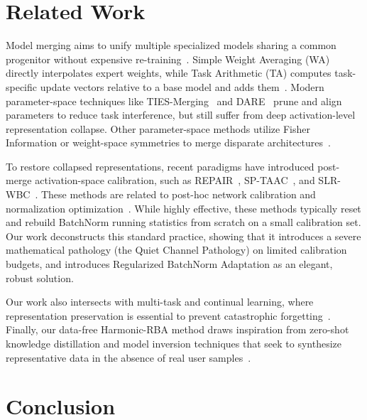 \documentclass{article}
\begin{document}
\section{Related Work}
\label{sec:related}

Model merging aims to unify multiple specialized models sharing a common progenitor without expensive re-training~\cite{wortsman2022model}. Simple Weight Averaging (WA) directly interpolates expert weights, while Task Arithmetic (TA) computes task-specific update vectors relative to a base model and adds them~\cite{ilharco2022editing}. Modern parameter-space techniques like TIES-Merging~\cite{yadav2023ties} and DARE~\cite{yu2024dare} prune and align parameters to reduce task interference, but still suffer from deep activation-level representation collapse. Other parameter-space methods utilize Fisher Information or weight-space symmetries to merge disparate architectures~\cite{matena2022merging, stoica2023zipit, yang2024model}.

To restore collapsed representations, recent paradigms have introduced post-merge activation-space calibration, such as REPAIR~\cite{jordan2023repair}, SP-TAAC~\cite{anonymous2026b}, and SLR-WBC~\cite{agent2026}. These methods are related to post-hoc network calibration and normalization optimization~\cite{ioffe2015batch, guo2017on, minderer2021revisiting, nixon2019measuring, frankle2020training, lubana2021how, ulyanov2016instance}. While highly effective, these methods typically reset and rebuild BatchNorm running statistics from scratch on a small calibration set. Our work deconstructs this standard practice, showing that it introduces a severe mathematical pathology (the Quiet Channel Pathology) on limited calibration budgets, and introduces Regularized BatchNorm Adaptation as an elegant, robust solution.

Our work also intersects with multi-task and continual learning, where representation preservation is essential to prevent catastrophic forgetting~\cite{caruana1997multitask, ruder2017overview, collobert2008unified, kirkpatrick2017overcoming, zenke2017continual, lopez2017gradient, chaudhry2018efficient}. Finally, our data-free Harmonic-RBA method draws inspiration from zero-shot knowledge distillation and model inversion techniques that seek to synthesize representative data in the absence of real user samples~\cite{yin2020dreaming, nayak2019zero, lopes2017data, fang2022contrastive, haroush2020knowledge, chawla2021data}.

\section{Conclusion}
\label{sec:conclusion}
\end{document}
